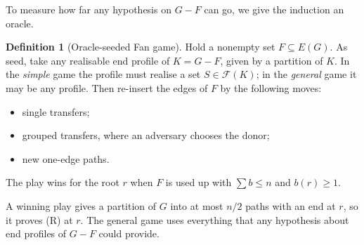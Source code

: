 \documentclass[11pt]{amsart}
\theoremstyle{definition}
\newtheorem{definition}[theorem]{Definition}
\newcommand{\cF}{\mathcal F}
\begin{document}
To measure how far any hypothesis on $G-F$ can go, we give the induction an oracle.

\begin{definition}[Oracle-seeded Fan game]\label{def:oracle}
Hold a nonempty set $F\subseteq E(G)$. As seed, take any realisable end profile of $K=G-F$, given by
a partition of $K$. In the \emph{simple} game the profile must realise a set $S\in\cF(K)$; in the
\emph{general} game it may be any profile. Then re-insert the edges of $F$ by the following moves:
\begin{itemize}
\item single transfers;
\item grouped transfers, where an adversary chooses the donor;
\item new one-edge paths.
\end{itemize}
The play wins for the root $r$ when $F$ is used up with $\sum b\le n$ and $b(r)\ge1$.
\end{definition}

A winning play gives a partition of $G$ into at most $n/2$ paths with an end at $r$, so it proves (R)
at $r$. The general game uses everything that any hypothesis about end profiles of $G-F$ could
provide.
\end{document}
